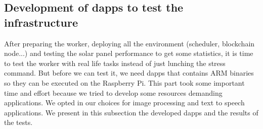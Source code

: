     \subsection{Development of dapps to test the infrastructure}
    After preparing the worker, deploying all the environment (scheduler, blockchain node...) and testing
    the solar panel performance to get some statistics, it is time to test the worker with real life tasks
    instead of just lunching the stress command. But before we can test it, we need dapps that contains ARM
    binaries so they can be executed on the Raspberry Pi. This part took some important time and effort because
    we tried to develop some resources demanding applications. We opted in our choices for image processing
    and text to speech applications. We present in this subsection the developed dapps and the results of the
    tests.

